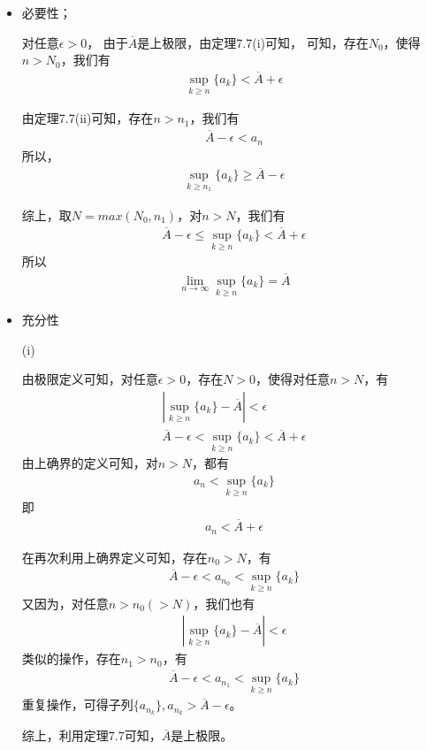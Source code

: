 \documentclass{article}
\begin{document}
\begin{itemize}
  \item 必要性；

        对任意$\epsilon > 0$，
        由于$\overline{A}$是上极限，由定理7.7(i)可知，
        可知，存在$N_0$，使得$n > N_0$，我们有
        \begin{align*}
          \sup\limits_{k \geq n} \{a_k\} < \overline{A} + \epsilon
        \end{align*}

        由定理7.7(ii)可知，存在$n > n_1$，我们有
        \begin{align*}
          \overline{A} - \epsilon < a_n
        \end{align*}
        所以，
        \begin{align*}
          \sup\limits_{k \geq n_1} \{a_k\} \geq \overline{A} - \epsilon
        \end{align*}

        综上，取$N = max(N_0, n_1)$，对$n > N$，我们有
        \begin{align*}
          \overline{A} - \epsilon \leq \sup\limits_{k \geq n} \{a_k\} < \overline{A} + \epsilon
        \end{align*}
        所以
        \begin{align*}
          \lim \limits_{n \to \infty} \sup\limits_{k \geq n} \{a_k\} = \overline{A}
        \end{align*}

  \item 充分性

        (i)

        由极限定义可知，对任意$\epsilon>0$，存在$N > 0$，使得对任意$n > N$，有
        \begin{align*}
          |\sup\limits_{k \geq n} \{a_k\} - \overline{A}| < \epsilon \\
          \overline{A} - \epsilon < \sup\limits_{k \geq n} \{a_k\} < \overline{A} + \epsilon
        \end{align*}
        由上确界的定义可知，对$n > N$，都有
        \begin{align*}
          a_n < \sup\limits_{k \geq n} \{a_k\}
        \end{align*}
        即
        \begin{align*}
          a_n < \overline{A} + \epsilon
        \end{align*}

        在再次利用上确界定义可知，存在$n_0 > N$，有
        \begin{align*}
          \overline{A} - \epsilon < a_{n_0} < \sup\limits_{k \geq n} \{a_k\}
        \end{align*}
        又因为，对任意$n > n_0 (> N)$，我们也有
        \begin{align*}
          |\sup\limits_{k \geq n} \{a_k\} - \overline{A}| < \epsilon
        \end{align*}
        类似的操作，存在$n_1 > n_0$，有
        \begin{align*}
          \overline{A} - \epsilon < a_{n_1} < \sup\limits_{k \geq n} \{a_k\}
        \end{align*}
        重复操作，可得子列$\{a_{n_k}\}, a_{n_k} > \overline{A} - \epsilon$。

        综上，利用定理7.7可知，$\overline{A}$是上极限。

\end{itemize}
\end{document}
